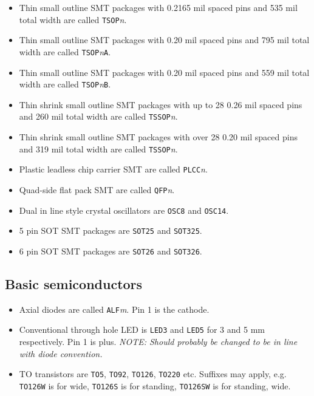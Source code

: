 \documentclass{article}
\begin{document}
\begin{itemize}
\item   Thin small outline SMT packages with 0.2165 mil spaced pins and
	535 mil total width are called {\tt TSOP}{\it n}.

\item   Thin small outline SMT packages with 0.20 mil spaced pins and
	795 mil total width are called {\tt TSOP}{\it n}{\tt A}.

\item   Thin small outline SMT packages with 0.20 mil spaced pins and
	559 mil total width are called {\tt TSOP}{\it n}{\tt B}.

\item   Thin shrink small outline SMT packages with up to 28 0.26 mil
	spaced pins and 260 mil total width are called {\tt TSSOP}{\it n}.

\item   Thin shrink small outline SMT packages with over 28 0.20 mil
	spaced pins and 319 mil total width are called {\tt TSSOP}{\it n}.

\item   Plastic leadless chip carrier SMT are called {\tt PLCC}{\it n}.

\item   Quad-side flat pack SMT are called {\tt QFP}{\it n}.

\item   Dual in line style crystal oscillators are {\tt OSC8} and
	{\tt OSC14}.

\item   5 pin SOT SMT packages are {\tt SOT25} and {\tt SOT325}.

\item   6 pin SOT SMT packages are {\tt SOT26} and {\tt SOT326}.
\end{itemize}

\subsection{Basic semiconductors}
\begin{itemize}
\item   Axial diodes are called {\tt ALF}{\it m}. Pin 1 is the cathode.

\item   Conventional through hole LED is {\tt LED3} and {\tt LED5}
	for 3 and 5 mm respectively. Pin 1 is plus. 
	{\it NOTE: Should probably be changed to be in line with diode
	convention.}

\item   TO transistors are {\tt TO5}, {\tt TO92}, {\tt TO126}, 
	{\tt TO220} etc. Suffixes may apply, e.g. {\tt TO126W} is for 
	wide, {\tt TO126S} is for standing, {\tt TO126SW} is for standing,
	wide.
\end{itemize}
\end{document}
